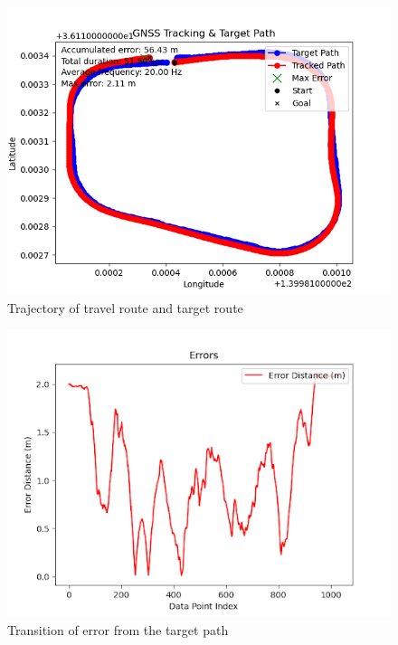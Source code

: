 \begin{figure}[H]
     \centering
    \includegraphics[keepaspectratio, scale=0.55]
         {images/6msIAE.png}
    \caption{Trajectory of travel route and target route}
    \label{fig:path}
\end{figure}

\begin{figure}[H]
     \centering
    \includegraphics[keepaspectratio, scale=0.7]
         {images/6mserror.png}
    \caption{Transition of error from the target path}
    \label{fig:path}
\end{figure}

